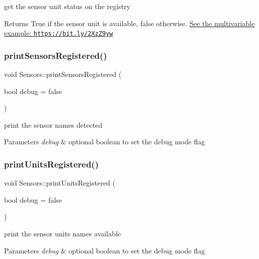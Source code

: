 get the sensor unit status on the registry 

\begin{DoxyReturn}{Returns}
True if the sensor unit is available, false otherwise. \hyperlink{}{See the multivariable example\+: \href{https://bit.ly/2XzZ9yw}{\tt https\+://bit.\+ly/2\+Xz\+Z9yw} }
\end{DoxyReturn}
\mbox{\label{classSensors_aed05af978baed0801ff4de5f1c367cf0}} 
\subsubsection{\texorpdfstring{print\+Sensors\+Registered()}{printSensorsRegistered()}}
{\footnotesize\ttfamily void Sensors\+::print\+Sensors\+Registered (\begin{DoxyParamCaption}\item[{bool}]{debug = {\ttfamily false} }\end{DoxyParamCaption})}



print the sensor names detected 


\begin{DoxyParams}{Parameters}
{\em debug} & optional boolean to set the debug mode flag \\
\hline
\end{DoxyParams}
\mbox{\label{classSensors_a0e9516d728256efd1eba97ef834cd385}} 
\subsubsection{\texorpdfstring{print\+Units\+Registered()}{printUnitsRegistered()}}
{\footnotesize\ttfamily void Sensors\+::print\+Units\+Registered (\begin{DoxyParamCaption}\item[{bool}]{debug = {\ttfamily false} }\end{DoxyParamCaption})}



print the sensor units names available 


\begin{DoxyParams}{Parameters}
{\em debug} & optional boolean to set the debug mode flag \\
\hline
\end{DoxyParams}
\mbox{\label{classSensors_ae6ac6080b6ad79ba9cd441646826058d}} 

